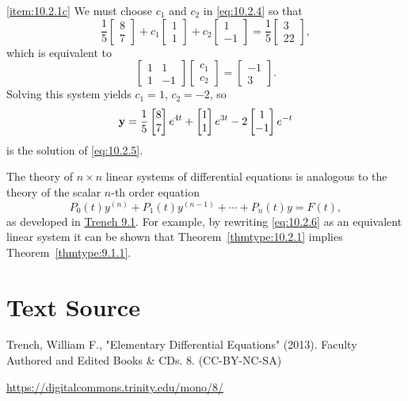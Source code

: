 \documentclass{ximera}
\begin{document}
\begin{example}
\begin{explanation}
\ref{item:10.2.1c}
We must choose $c_1$ and $c_2$ in \eqref{eq:10.2.4} so that
$$
\frac{1}{5}\begin{bmatrix}8\\7\end{bmatrix}+c_1\begin{bmatrix}1\\1\end{bmatrix}+c_2\begin{bmatrix}1\\-1\end{bmatrix}=\frac{1}{5}\begin{bmatrix}3\\22\end{bmatrix},
$$
which is equivalent to
$$
\begin{bmatrix}1&1\\1&-1\end{bmatrix}\begin{bmatrix}c_1\\c_2\end{bmatrix}=\begin{bmatrix}-1\\3\end{bmatrix}.
$$
Solving this system yields $c_1=1$, $c_2=-2$, so
$$
{\bf y}=\frac{1}{5}\begin{bmatrix}8\\7\end{bmatrix}e^{4t}+\begin{bmatrix}1\\1\end{bmatrix}e^{3t}-2\begin{bmatrix}1\\-1\end{bmatrix}e^{-t}
$$
is the solution of  \eqref{eq:10.2.5}.
\end{explanation}
\end{example}


\begin{remark}The theory of $n\times n$ linear systems of differential
equations is analogous to the theory of the scalar $n$-th order
equation
\begin{equation} \label{eq:10.2.6}
P_0(t)y^{(n)}+P_1(t)y^{(n-1)}+\cdots+P_n(t)y=F(t),
\end{equation}
as
developed in \href{https://ximera.osu.edu/ode/main/linearHigherOrder/linearHigherOrder}{Trench 9.1}. For example, by rewriting
\eqref{eq:10.2.6} as an equivalent linear system it can be shown that
Theorem~\ref{thmtype:10.2.1} implies Theorem~\ref{thmtype:9.1.1}.
\end{remark}




\section*{Text Source}
Trench, William F., "Elementary Differential Equations" (2013). Faculty Authored and Edited Books \& CDs. 8. (CC-BY-NC-SA)

\href{https://digitalcommons.trinity.edu/mono/8/}{https://digitalcommons.trinity.edu/mono/8/}
\end{document}
